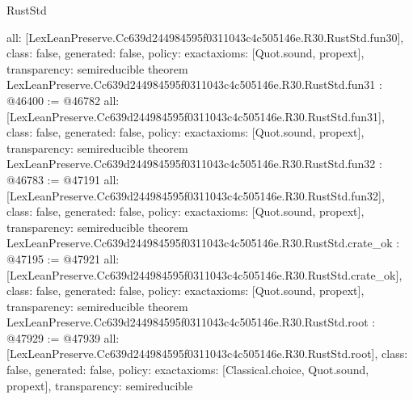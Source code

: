 \begin{lexlean}{RustStd}
\begin{coremodule}
{  all: [LexLeanPreserve.Cc639d244984595f0311043c4c505146e.R30.RustStd.fun30],
  class: false,
  generated: false,
  policy: exact{axioms: [Quot.sound, propext]},
  transparency: semireducible
}
theorem LexLeanPreserve.Cc639d244984595f0311043c4c505146e.R30.RustStd.fun31 : @46400 := @46782 {
  all: [LexLeanPreserve.Cc639d244984595f0311043c4c505146e.R30.RustStd.fun31],
  class: false,
  generated: false,
  policy: exact{axioms: [Quot.sound, propext]},
  transparency: semireducible
}
theorem LexLeanPreserve.Cc639d244984595f0311043c4c505146e.R30.RustStd.fun32 : @46783 := @47191 {
  all: [LexLeanPreserve.Cc639d244984595f0311043c4c505146e.R30.RustStd.fun32],
  class: false,
  generated: false,
  policy: exact{axioms: [Quot.sound, propext]},
  transparency: semireducible
}
theorem LexLeanPreserve.Cc639d244984595f0311043c4c505146e.R30.RustStd.crate_ok : @47195 := @47921 {
  all: [LexLeanPreserve.Cc639d244984595f0311043c4c505146e.R30.RustStd.crate_ok],
  class: false,
  generated: false,
  policy: exact{axioms: [Quot.sound, propext]},
  transparency: semireducible
}
theorem LexLeanPreserve.Cc639d244984595f0311043c4c505146e.R30.RustStd.root : @47929 := @47939 {
  all: [LexLeanPreserve.Cc639d244984595f0311043c4c505146e.R30.RustStd.root],
  class: false,
  generated: false,
  policy: exact{axioms: [Classical.choice, Quot.sound, propext]},
  transparency: semireducible
}


\end{coremodule}
\end{lexlean}
